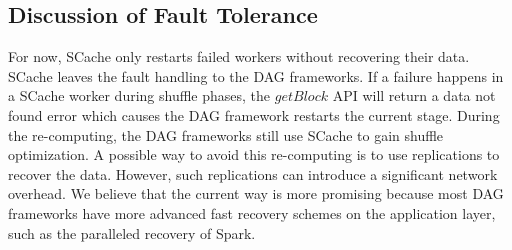 

{\color{black}
\subsection{Discussion of Fault Tolerance}\label{fault}
For now, SCache only restarts failed workers without recovering their data.
SCache leaves the fault handling to the DAG frameworks.
If a failure happens in a SCache worker during shuffle phases, the $getBlock$ API will return a data not found error which causes the DAG framework restarts the current stage.
During the re-computing, the DAG frameworks still use SCache to gain shuffle optimization.
A possible way to avoid this re-computing is to use replications to recover the data.
However, such replications can introduce a significant network overhead.
We believe that the current way is more promising because most DAG frameworks have more advanced fast recovery schemes on the application layer, such as the paralleled recovery of Spark. 
}

